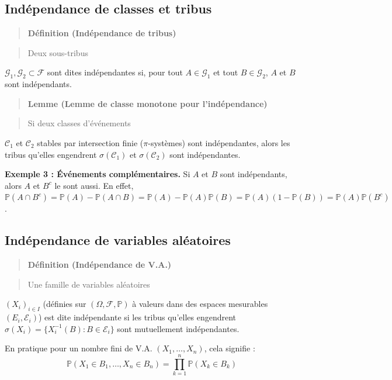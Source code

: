 \documentclass[11pt,a4paper]{article}
\begin{document}
\subsection{Indépendance de classes et tribus}

\begin{quote}
\textbf{Définition (Indépendance de tribus)}
\end{quote}
\begin{quote}
Deux sous-tribus
\end{quote}$\mathcal{G}_1, \mathcal{G}_2 \subset \mathcal{F}$ sont dites indépendantes si, pour tout $A \in \mathcal{G}_1$ et tout $B \in \mathcal{G}_2$, $A$ et $B$ sont indépendants.

\begin{quote}
\textbf{Lemme (Lemme de classe monotone pour l'indépendance)}
\end{quote}
\begin{quote}
Si deux classes d'événements
\end{quote}$\mathcal{C}_1$ et $\mathcal{C}_2$ stables par intersection finie ($\pi$-systèmes) sont indépendantes, alors les tribus qu'elles engendrent $\sigma(\mathcal{C}_1)$ et $\sigma(\mathcal{C}_2)$ sont indépendantes.

\textbf{Exemple 3 : Événements complémentaires.}
Si $A$ et $B$ sont indépendants, alors $A$ et $B^c$ le sont aussi.
En effet, $\mathbb{P}(A \cap B^c) = \mathbb{P}(A) - \mathbb{P}(A \cap B) = \mathbb{P}(A) - \mathbb{P}(A)\mathbb{P}(B) = \mathbb{P}(A)(1 - \mathbb{P}(B)) = \mathbb{P}(A)\mathbb{P}(B^c)$.

\subsection{Indépendance de variables aléatoires}

\begin{quote}
\textbf{Définition (Indépendance de V.A.)}
\end{quote}
\begin{quote}
Une famille de variables aléatoires
\end{quote}$(X_i)_{i \in I}$ (définies sur $(\Omega, \mathcal{F}, \mathbb{P})$ à valeurs dans des espaces mesurables $(E_i, \mathcal{E}_i)$) est dite indépendante si les tribus qu'elles engendrent $\sigma(X_i) = \{X_i^{-1}(B) : B \in \mathcal{E}_i\}$ sont mutuellement indépendantes.

En pratique pour un nombre fini de V.A. $(X_1, \ldots, X_n)$, cela signifie :
$$\mathbb{P}(X_1 \in B_1, \ldots, X_n \in B_n) = \prod_{k=1}^n \mathbb{P}(X_k \in B_k)$$
\end{document}
